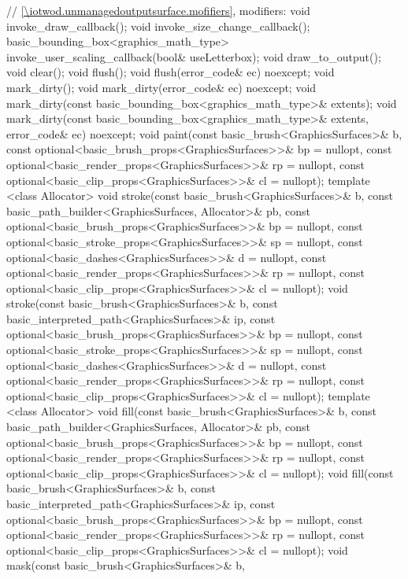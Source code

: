 \begin{codeblock}
{{    // \ref{\iotwod.unmanagedoutputsurface.mofifiers}, modifiers:
    void invoke_draw_callback();
    void invoke_size_change_callback();
    basic_bounding_box<graphics_math_type> invoke_user_scaling_callback(bool& useLetterbox);
    void draw_to_output();
    void clear();
    void flush();
    void flush(error_code& ec) noexcept;
    void mark_dirty();
    void mark_dirty(error_code& ec) noexcept;
    void mark_dirty(const basic_bounding_box<graphics_math_type>& extents);
    void mark_dirty(const basic_bounding_box<graphics_math_type>& extents, error_code& ec)
      noexcept;
    void paint(const basic_brush<GraphicsSurfaces>& b,
      const optional<basic_brush_props<GraphicsSurfaces>>& bp = nullopt,
      const optional<basic_render_props<GraphicsSurfaces>>& rp = nullopt,
      const optional<basic_clip_props<GraphicsSurfaces>>& cl = nullopt);
    template <class Allocator>
    void stroke(const basic_brush<GraphicsSurfaces>& b,
      const basic_path_builder<GraphicsSurfaces, Allocator>& pb,
      const optional<basic_brush_props<GraphicsSurfaces>>& bp = nullopt,
      const optional<basic_stroke_props<GraphicsSurfaces>>& sp = nullopt,
      const optional<basic_dashes<GraphicsSurfaces>>& d = nullopt,
      const optional<basic_render_props<GraphicsSurfaces>>& rp = nullopt,
      const optional<basic_clip_props<GraphicsSurfaces>>& cl = nullopt);
    void stroke(const basic_brush<GraphicsSurfaces>& b,
      const basic_interpreted_path<GraphicsSurfaces>& ip,
      const optional<basic_brush_props<GraphicsSurfaces>>& bp = nullopt,
      const optional<basic_stroke_props<GraphicsSurfaces>>& sp = nullopt,
      const optional<basic_dashes<GraphicsSurfaces>>& d = nullopt,
      const optional<basic_render_props<GraphicsSurfaces>>& rp = nullopt,
      const optional<basic_clip_props<GraphicsSurfaces>>& cl = nullopt);
    template <class Allocator>
    void fill(const basic_brush<GraphicsSurfaces>& b,
      const basic_path_builder<GraphicsSurfaces, Allocator>& pb,
      const optional<basic_brush_props<GraphicsSurfaces>>& bp = nullopt,
      const optional<basic_render_props<GraphicsSurfaces>>& rp = nullopt,
      const optional<basic_clip_props<GraphicsSurfaces>>& cl = nullopt);
    void fill(const basic_brush<GraphicsSurfaces>& b,
      const basic_interpreted_path<GraphicsSurfaces>& ip,
      const optional<basic_brush_props<GraphicsSurfaces>>& bp = nullopt,
      const optional<basic_render_props<GraphicsSurfaces>>& rp = nullopt,
      const optional<basic_clip_props<GraphicsSurfaces>>& cl = nullopt);
    void mask(const basic_brush<GraphicsSurfaces>& b,
}}
\end{codeblock}
